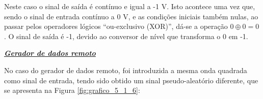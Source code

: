 \documentclass[a4paper,11pt]{report}
\begin{document}
Neste caso o sinal de saída é contínuo e igual a -1 V. Isto acontece uma vez que, sendo o sinal de entrada contínuo a 0 V, e as condições iniciais também nulas, ao passar pelos operadores lógicos ``ou-exclusivo (XOR)'', dá-se a operação $0\oplus 0=0$. O sinal de saída é -1, devido ao conversor de nível que transforma o 0 em -1.\\
\par

\large\underline{{\textit{\textbf{Gerador de dados remoto}}}}\\
\par

No caso do gerador de dados remoto, foi introduzida a mesma onda quadrada como sinal de entrada, tendo sido obtido um sinal pseudo-aleatório diferente, que se apresenta na Figura \ref{fig:grafico_5_1_6}:
\end{document}

